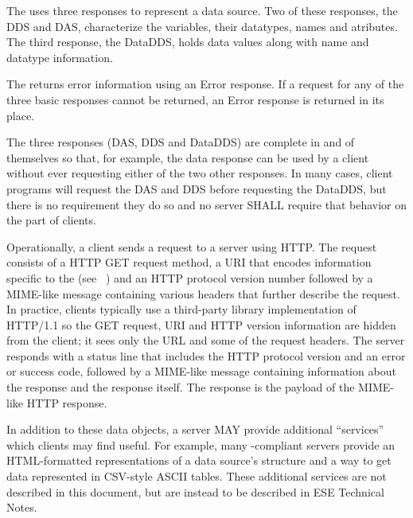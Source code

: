 \documentclass[justify]{nasa-ese}
\begin{document}
The \DAP uses three responses to represent a
data source. Two of these responses, the \ac{DDS} and
\ac{DAS}, characterize the variables, their datatypes, names and
atributes. The third response, the \ac{DataDDS}, holds
data values along with name and datatype information.

The \DAP returns error information using an Error response. If a request
for any of the three basic responses cannot be returned, an Error response is
returned in its place.

The three responses (\ac{DAS}, \ac{DDS}
and \ac{DataDDS}) are complete in and of themselves so that, for example, the
data response can be used by a client without ever requesting either of the
two other responses. In many cases, client programs will request the
\ac{DAS} and \ac{DDS} before requesting the \ac{DataDDS}, but there is no
requirement they do so and no server SHALL require that behavior on the part of
clients. 


Operationally, a \DAP client sends a request to a server using \ac{HTTP}. The
request consists of a \ac{HTTP} GET request method, a \ac{URI}\cite{rfc2396}
that encodes information specific to the \DAP (see
~) and an \ac{HTTP} protocol version number
followed by a MIME-like message containing various headers that further
describe the request. In practice, \DAP clients typically use a third-party
library implementation of \ac{HTTP}/1.1 so the GET request, \ac{URI} and
\ac{HTTP} version information are hidden from the client; it sees only the
\DAP \ac{URL} and some of the request headers. The \DAP server responds with
a status line that includes the \ac{HTTP} protocol version and an error or
success code, followed by a MIME-like message containing information about
the response and the response itself. The \DAP response is the payload of the
MIME-like \ac{HTTP} response.

In addition to these data objects, a \DAP server MAY provide additional
``services'' which clients may find useful. For example, many
\DAP-compliant servers provide an HTML-formatted representations of
a data source's structure and a way to get data represented in CSV-style ASCII
tables. These additional services are not described in this document, but are
instead to be described in ESE Technical Notes.
\end{document}
